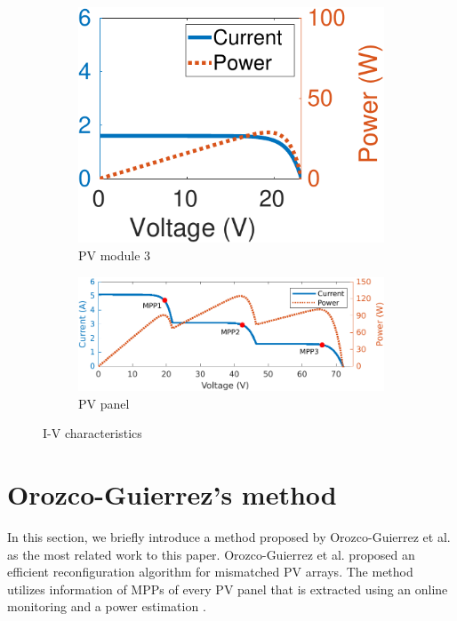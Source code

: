 \documentclass[conference]{pvsctran}
\begin{document}
\begin{figure}
\begin{subfigure}[b]{0.3\linewidth}
        \includegraphics[width=\linewidth]{../fig/m_3.png}
        \caption{PV module 3}
    \end{subfigure}
    \hfill
    \begin{subfigure}[b]{\linewidth}
        \centering
        \vspace{3mm}
        \includegraphics[width=\linewidth]{../fig/panel.png}
        \caption{PV panel}
    \end{subfigure}
    \caption{I-V characteristics}
    \label{fig:IV}
\end{figure}






\section{Orozco-Guierrez's method}\label{Sec3}
In this section, we briefly introduce a method proposed by Orozco-Guierrez et al.\cite{orozco2016optimized} as the most related work to this paper.
Orozco-Guierrez et al. proposed an efficient reconfiguration algorithm for mismatched PV arrays. 
The method utilizes information of MPPs of every PV panel that is extracted using an online monitoring \cite{carotenuto2014online} and a power estimation \cite{orozco2015fast}.
\end{document}
